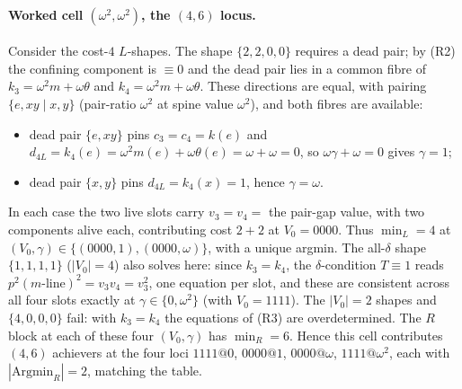 \documentclass[11pt]{article}
\theoremstyle{plain}
\theoremstyle{definition}
\theoremstyle{remark}
\begin{document}
\paragraph{Worked cell $(\omega^2,\omega^2)$, the $(4,6)$ locus.}
Consider the cost-$4$ $L$-shapes. The shape $\{2,2,0,0\}$ requires a dead pair; by (R2) the
confining component is $\equiv 0$ and the dead pair lies in a common fibre of
$k_3=\omega^2 m+\omega\theta$ and $k_4=\omega^2 m+\omega\theta$. These directions are equal,
with pairing $\{e,xy\mid x,y\}$ (pair-ratio $\omega^2$ at spine value $\omega^2$), and both
fibres are available:
\begin{itemize}
\item dead pair $\{e,xy\}$ pins $c_3=c_4=k(e)$ and $d_{4L}=k_4(e)=\omega^2 m(e)+\omega\theta(e)
  =\omega+\omega=0$, so $\omega\gamma+\omega=0$ gives $\gamma=1$;
\item dead pair $\{x,y\}$ pins $d_{4L}=k_4(x)=1$, hence $\gamma=\omega$.
\end{itemize}
In each case the two live slots carry $v_3=v_4=$ the pair-gap value, with two components
alive each, contributing cost $2+2$ at $V_0=0000$. Thus $\min_L=4$ at
$(V_0,\gamma)\in\{(0000,1),(0000,\omega)\}$, with a unique argmin. The all-$\delta$ shape
$\{1,1,1,1\}$ ($|V_0|=4$) also solves here: since $k_3=k_4$, the $\delta$-condition $T\equiv1$
reads $p^2(m\text{-line})^2=v_3 v_4=v_3^2$, one equation per slot, and these are consistent
across all four slots exactly at $\gamma\in\{0,\omega^2\}$ (with $V_0=1111$). The $|V_0|=2$
shapes and $\{4,0,0,0\}$ fail: with $k_3=k_4$ the equations of (R3) are overdetermined. The
$R$ block at each of these four $(V_0,\gamma)$ has $\min_R=6$. Hence this cell contributes
$(4,6)$ achievers at the four loci $1111@0$, $0000@1$, $0000@\omega$, $1111@\omega^2$, each
with $|\mathrm{Argmin}_R|=2$, matching the table.
\end{document}
